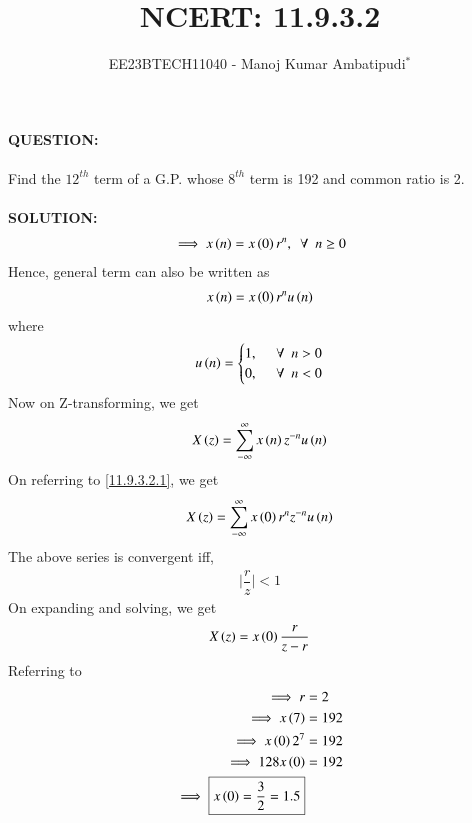 \documentclass[journal,12pt,twocolumn]{IEEEtran}
\theoremstyle{remark}
\begin{document}

\vspace{3cm}
\title{NCERT: 11.9.3.2}
\author{EE23BTECH11040 - Manoj Kumar Ambatipudi$^{*}$%
}
\maketitle
\newpage
\bigskip
\renewcommand{\thefigure}{\theenumi}
\renewcommand{\thetable}{\theenumi}
\textbf{QUESTION:}\\\\
Find the $12^{th}$ term of a G.P. whose $8^{th}$ term is 192 and common ratio is 2.\\\\
\textbf{SOLUTION:}\\
\begin{align}
    \implies x\left(n\right)=x\left(0\right)r^{n},\,\,\,\forall\,\,\,n\geq0
\end{align}
Hence, general term can also be written as 
\begin{align}
    x\left(n\right)=x\left(0\right)r^{n}u\left(n\right)\label{11.9.3.2.1}
\end{align}
where 
\[
u\left(n\right)=
\begin{cases}
    1,&\,\,\,\forall\,\,\,n>0\\
    0,&\,\,\,\forall\,\,\,n<0
\end{cases}
\]
Now on Z-transforming, we get
\begin{align}
    X\left(z\right)=\sum_{-\infty}^{\infty}x\left(n\right)z^{-n}u\left(n\right)
\end{align}      
On referring to \ref{11.9.3.2.1}, we get
\begin{align}
X\left(z\right)=\sum_{-\infty}^{\infty}x\left(0\right)r^{n}z^{-n}u\left(n\right)
\end{align}
The above series is convergent iff,
\begin{align}
    \bigg|\dfrac{r}{z}\bigg| < 1
\end{align}
On expanding and solving, we get
\begin{align}
    X\left(z\right)=x\left(0\right)\dfrac{r}{z-r}
\end{align}
Referring to 
\begin{align}
\implies           r&=2\\
\implies     x\left(7\right)&=192\\
\implies x\left(0\right)2^{7}&=192\\
\implies 128x\left(0\right)&=192\\
\implies\boxed{x\left(0\right)=\dfrac{3}{2}=1.5}
\end{align}
\end{document}
